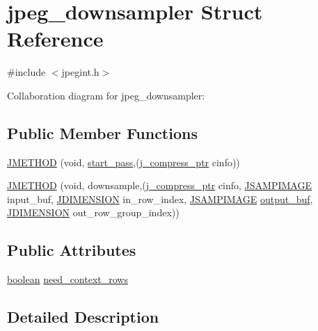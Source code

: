 \hypertarget{structjpeg__downsampler}{}\section{jpeg\+\_\+downsampler Struct Reference}
\label{structjpeg__downsampler}


{\ttfamily \#include $<$jpegint.\+h$>$}



Collaboration diagram for jpeg\+\_\+downsampler\+:
\subsection*{Public Member Functions}
\begin{DoxyCompactItemize}
\item 
\mbox{\hyperlink{structjpeg__downsampler_a1ca33229e63cdb80020c714f1cd28ea0}{J\+M\+E\+T\+H\+OD}} (void, \mbox{\hyperlink{jddctmgr_8c_a1964f006adb8fb80f57e455f6452aec1}{start\+\_\+pass}},(\mbox{\hyperlink{jpeglib_8h_add2a072c54e3a51550f4975f7ddb91e7}{j\+\_\+compress\+\_\+ptr}} cinfo))
\item 
\mbox{\hyperlink{structjpeg__downsampler_a611ebcb0ae11e4d1c6ba4222caacaec4}{J\+M\+E\+T\+H\+OD}} (void, downsample,(\mbox{\hyperlink{jpeglib_8h_add2a072c54e3a51550f4975f7ddb91e7}{j\+\_\+compress\+\_\+ptr}} cinfo, \mbox{\hyperlink{jpeglib_8h_a4bf858e4d42202287e786bdec2f3b62b}{J\+S\+A\+M\+P\+I\+M\+A\+GE}} input\+\_\+buf, \mbox{\hyperlink{jmorecfg_8h_a04ed4674f6f1d0d50ec241531e38274f}{J\+D\+I\+M\+E\+N\+S\+I\+ON}} in\+\_\+row\+\_\+index, \mbox{\hyperlink{jpeglib_8h_a4bf858e4d42202287e786bdec2f3b62b}{J\+S\+A\+M\+P\+I\+M\+A\+GE}} \mbox{\hyperlink{jdct_8h_ad7e4660a191b1a791748dd44d5a7a0ec}{output\+\_\+buf}}, \mbox{\hyperlink{jmorecfg_8h_a04ed4674f6f1d0d50ec241531e38274f}{J\+D\+I\+M\+E\+N\+S\+I\+ON}} out\+\_\+row\+\_\+group\+\_\+index))
\end{DoxyCompactItemize}
\subsection*{Public Attributes}
\begin{DoxyCompactItemize}
\item 
\mbox{\hyperlink{jmorecfg_8h_a7c6368b321bd9acd0149b030bb8275ed}{boolean}} \mbox{\hyperlink{structjpeg__downsampler_ab177a119691924a4bdd2223df7f5ed08}{need\+\_\+context\+\_\+rows}}
\end{DoxyCompactItemize}


\subsection{Detailed Description}


